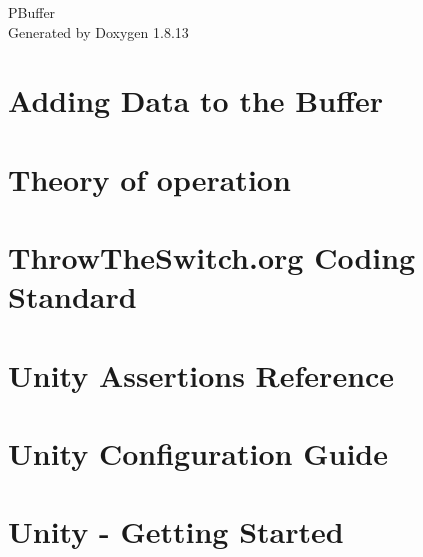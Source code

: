 \documentclass[twoside]{book}
\newcommand{\+}{\discretionary{\mbox{\scriptsize$\hookleftarrow$}}{}{}}
\newcommand{\clearemptydoublepage}{%
  \newpage{\pagestyle{empty}\cleardoublepage}%
}
\begin{document}
\hypersetup{pageanchor=false,
             bookmarksnumbered=true,
             pdfencoding=unicode
            }
\begin{titlepage}
\vspace*{7cm}
\begin{center}%
{\Large P\+Buffer }\\
\vspace*{1cm}
{\large Generated by Doxygen 1.8.13}\\
\end{center}
\end{titlepage}
\clearemptydoublepage
{}
\tableofcontents
\clearemptydoublepage
{}
\hypersetup{pageanchor=true}

\chapter{Adding Data to the Buffer}
\label{md_adding_data_to_the_buffer}

\chapter{Theory of operation}
\label{md_src_theory_of_operation}

\chapter{Throw\+The\+Switch.\+org Coding Standard}
\label{md_test_unity_docs_ThrowTheSwitchCodingStandard}

\chapter{Unity Assertions Reference}
\label{md_test_unity_docs_UnityAssertionsReference}

\chapter{Unity Configuration Guide}
\label{md_test_unity_docs_UnityConfigurationGuide}

\chapter{Unity -\/ Getting Started}
\label{md_test_unity_docs_UnityGettingStartedGuide}

\end{document}

